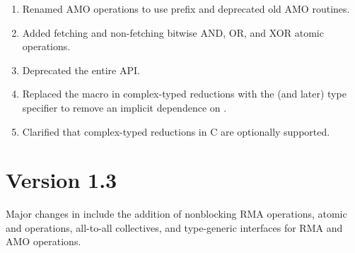 \begin{enumerate}
%
%
\item Renamed \ac{AMO} operations to use  prefix and
      deprecated old \ac{AMO} routines.
%
%
\item Added fetching and non-fetching bitwise AND, OR, and XOR atomic
      operations.
%
%
\item Deprecated the entire \Fortran \ac{API}.
%
%
\item Replaced the  macro in complex-typed reductions with the
      \Cstd[99] (and later) type specifier  to remove an
      implicit dependence on .
%
%
\item Clarified that complex-typed reductions in C are optionally supported.
%
%
\end{enumerate}




\section{Version 1.3}
Major changes in \openshmem[1.3] include the addition of
nonblocking \ac{RMA} operations,
atomic \PUT{} and \GET{} operations,
all-to-all collectives,
and \Cstd[11] type-generic interfaces for \ac{RMA} and \ac{AMO} operations.

